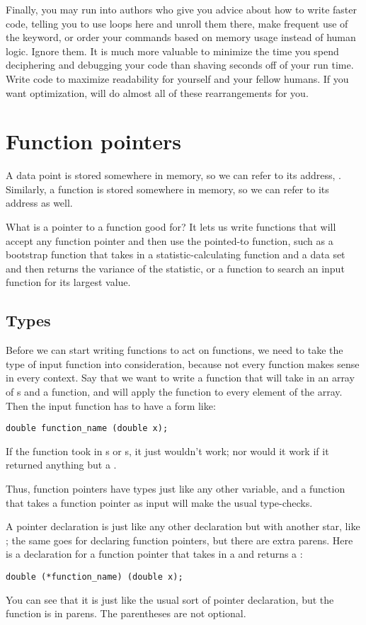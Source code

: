 Finally, you may run into authors who give you advice about how to write
faster code, telling you to use loops here and unroll them there, make
frequent use of the  keyword, or order your commands based
on memory usage instead of human logic. Ignore them. It is much more
valuable to minimize the time you spend deciphering and debugging your
code than shaving seconds off of your run time.  Write code to maximize
readability for yourself and your fellow humans. If you want optimization,
 will do almost all of these rearrangements for you.


\section{Function pointers} 
A data point  is stored somewhere in memory, so we can refer to
its address, . Similarly, a function  is stored somewhere
in memory, so we can refer to its address as well.

What is a pointer to a function good for?  It lets us write
functions that will accept any function pointer and then use the
pointed-to function, such as a bootstrap function that takes in a
statistic-calculating function and a data set and then returns the
variance of the statistic, or a function to search an input function
for its largest value.

\subsection{Types} Before we can start writing functions to act on
functions, we need to take the type of input function into
consideration, because not every function makes sense in every context. Say
that we want to write a function that will take in an array of
s and a function, and will apply the function to every
element of the array. Then the input function has to have a form like:
\begin{lstlisting}
double function_name (double x);
\end{lstlisting}

If the function took in s or s, it just
wouldn't work; nor would it work if it returned anything but a
.

Thus, function pointers have types just like any other variable, and a
function that takes a function pointer as input will make the usual
type-checks.

A pointer declaration is just like any other declaration but with
another star, like ; the same goes for declaring function
pointers, but there are extra parens. Here is a declaration for a
function pointer that takes in a  and returns a :
\begin{lstlisting}
double (*function_name) (double x);
\end{lstlisting}
You can see that it is just like the usual  sort of pointer declaration, but the function is in parens.  The parentheses are not
optional.

